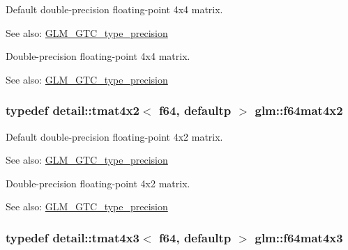 Default double-precision floating-point 4x4 matrix. \begin{Desc}
\item[See also:]\hyperlink{group__gtc__type__precision}{GLM\_\-GTC\_\-type\_\-precision}\end{Desc}
Double-precision floating-point 4x4 matrix. \begin{Desc}
\item[See also:]\hyperlink{group__gtc__type__precision}{GLM\_\-GTC\_\-type\_\-precision} \end{Desc}
\hypertarget{group__gtc__type__precision_ge716a8717cc6af191aec562d93ff6299}{
\subsubsection[f64mat4x2]{\setlength{\rightskip}{0pt plus 5cm}typedef detail::tmat4x2$<$ f64, defaultp $>$ {\bf glm::f64mat4x2}}}
\label{group__gtc__type__precision_ge716a8717cc6af191aec562d93ff6299}


Default double-precision floating-point 4x2 matrix. \begin{Desc}
\item[See also:]\hyperlink{group__gtc__type__precision}{GLM\_\-GTC\_\-type\_\-precision}\end{Desc}
Double-precision floating-point 4x2 matrix. \begin{Desc}
\item[See also:]\hyperlink{group__gtc__type__precision}{GLM\_\-GTC\_\-type\_\-precision} \end{Desc}
\hypertarget{group__gtc__type__precision_gca283f88500d9895afb939516e7372d1}{
\subsubsection[f64mat4x3]{\setlength{\rightskip}{0pt plus 5cm}typedef detail::tmat4x3$<$ f64, defaultp $>$ {\bf glm::f64mat4x3}}}
\label{group__gtc__type__precision_gca283f88500d9895afb939516e7372d1}


